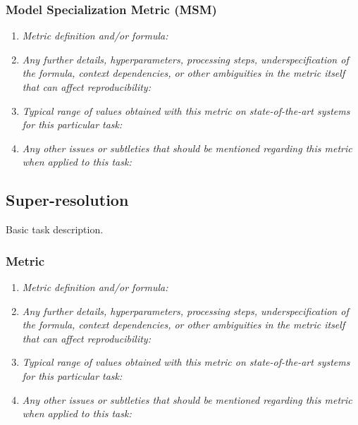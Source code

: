 \documentclass[a4paper,11pt]{article}
\begin{document}
        \subsubsection{Model Specialization Metric (MSM)}
            \begin{enumerate}[label=\alph*.]
                \item \textit{Metric definition and/or formula:}
                \bigskip
                \item \textit{Any further details, hyperparameters, processing steps, underspecification of the formula, context dependencies, or other ambiguities in the metric itself that can affect reproducibility:}
                \bigskip
                \item \textit{Typical range of values obtained with this metric on state-of-the-art systems for this particular task:}
                \bigskip
                \item \textit{Any other issues or subtleties that should be mentioned regarding this metric when applied to this task:}
                \bigskip
            \end{enumerate}


    \subsection{Super-resolution} \label{super_resolution}
        Basic task description.
        \subsubsection{Metric}
            \begin{enumerate}[label=\alph*.]
                \item \textit{Metric definition and/or formula:}
                \bigskip
                \item \textit{Any further details, hyperparameters, processing steps, underspecification of the formula, context dependencies, or other ambiguities in the metric itself that can affect reproducibility:}
                \bigskip
                \item \textit{Typical range of values obtained with this metric on state-of-the-art systems for this particular task:}
                \bigskip
                \item \textit{Any other issues or subtleties that should be mentioned regarding this metric when applied to this task:}
                \bigskip
            \end{enumerate}
\end{document}
